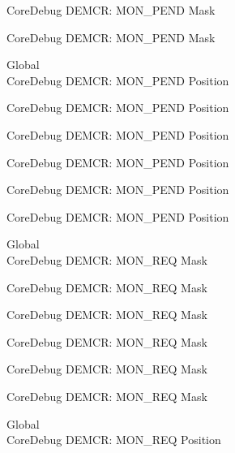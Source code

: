 \begin{DoxyRefList}
\label{deprecated__deprecated000503}%
%
Core\+Debug DEMCR\+: MON\+\_\+\+PEND Mask 

\label{deprecated__deprecated000605}%
%
Core\+Debug DEMCR\+: MON\+\_\+\+PEND Mask  
\item[Global \doxylink{group___c_m_s_i_s___core_debug_ga1e2f706a59e0d8131279af1c7e152f8d}{Core\+Debug\+\_\+\+DEMCR\+\_\+\+MON\+\_\+\+PEND\+\_\+\+Pos} ]\hfill \\
\label{deprecated__deprecated000051}%
%
Core\+Debug DEMCR\+: MON\+\_\+\+PEND Position 

\label{deprecated__deprecated000195}%
%
Core\+Debug DEMCR\+: MON\+\_\+\+PEND Position 

\label{deprecated__deprecated000337}%
%
Core\+Debug DEMCR\+: MON\+\_\+\+PEND Position 

\label{deprecated__deprecated000413}%
%
Core\+Debug DEMCR\+: MON\+\_\+\+PEND Position 

\label{deprecated__deprecated000502}%
%
Core\+Debug DEMCR\+: MON\+\_\+\+PEND Position 

\label{deprecated__deprecated000604}%
%
Core\+Debug DEMCR\+: MON\+\_\+\+PEND Position  
\item[Global \doxylink{group___c_m_s_i_s___core_debug_gae6384cbe8045051186d13ef9cdeace95}{Core\+Debug\+\_\+\+DEMCR\+\_\+\+MON\+\_\+\+REQ\+\_\+\+Msk} ]\hfill \\
\label{deprecated__deprecated000048}%
%
Core\+Debug DEMCR\+: MON\+\_\+\+REQ Mask 

\label{deprecated__deprecated000192}%
%
Core\+Debug DEMCR\+: MON\+\_\+\+REQ Mask 

\label{deprecated__deprecated000334}%
%
Core\+Debug DEMCR\+: MON\+\_\+\+REQ Mask 

\label{deprecated__deprecated000410}%
%
Core\+Debug DEMCR\+: MON\+\_\+\+REQ Mask 

\label{deprecated__deprecated000499}%
%
Core\+Debug DEMCR\+: MON\+\_\+\+REQ Mask 

\label{deprecated__deprecated000601}%
%
Core\+Debug DEMCR\+: MON\+\_\+\+REQ Mask  
\item[Global \doxylink{group___c_m_s_i_s___core_debug_ga341020a3b7450416d72544eaf8e57a64}{Core\+Debug\+\_\+\+DEMCR\+\_\+\+MON\+\_\+\+REQ\+\_\+\+Pos} ]\hfill \\
\label{deprecated__deprecated000047}%
%
Core\+Debug DEMCR\+: MON\+\_\+\+REQ Position 


\end{DoxyRefList}
